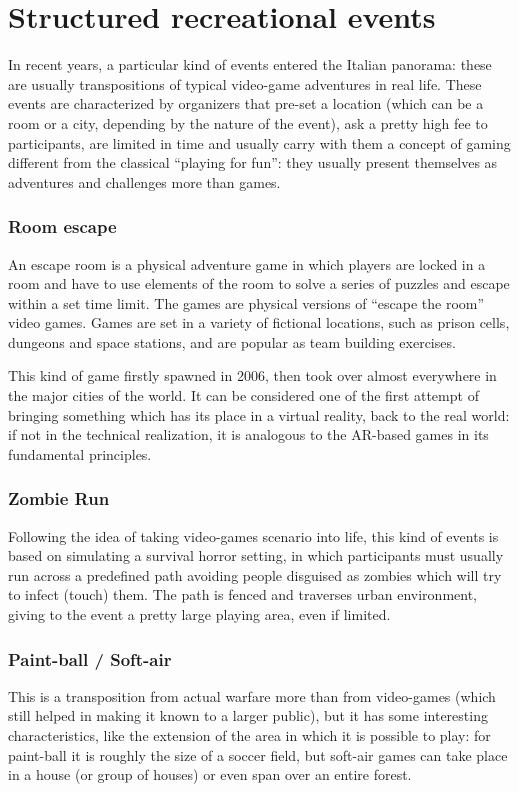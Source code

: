 	\section{Structured recreational events}
	
		In recent years, a particular kind of events entered the Italian panorama: these are usually transpositions of typical video-game adventures in real life.
		These events are characterized by organizers that pre-set a location (which can be a room or a city, depending by the nature of the event), ask a pretty high fee to participants, are limited in time and usually carry with them a concept of gaming different from the classical “playing for fun”: they usually present themselves as adventures and challenges more than games.
		
		\subsubsection{Room escape}
		
			\begin{quoting}
				An escape room is a physical adventure game in which players are locked in a room and have to use elements of the room to solve a series of puzzles and escape within a set time limit. The games are physical versions of “escape the room” video games. Games are set in a variety of fictional locations, such as prison cells, dungeons and space stations, and are popular as team building exercises.~\cite{wiki:escape}
			\end{quoting}
		
			This kind of game firstly spawned in 2006, then took over almost everywhere in the major cities of the world.
			It can be considered one of the first attempt of bringing something which has its place in a virtual reality, back to the real world: if not in the technical realization, it is analogous to the AR-based games in its fundamental principles.
		
		\subsubsection{Zombie Run}
		
			Following the idea of taking video-games scenario into life, this kind of events is based on simulating a survival horror setting, in which participants must usually run across a predefined path avoiding people disguised as zombies which will try to infect (touch) them. The path is fenced and traverses urban environment, giving to the event a pretty large playing area, even if limited.
		
		\subsubsection{Paint-ball / Soft-air}
			
			This is a transposition from actual warfare more than from video-games (which still helped in making it known to a larger public), but it has some interesting characteristics, like the extension of the area in which it is possible to play: for paint-ball it is roughly the size of a soccer field, but soft-air games can take place in a house (or group of houses) or even span over an entire forest.